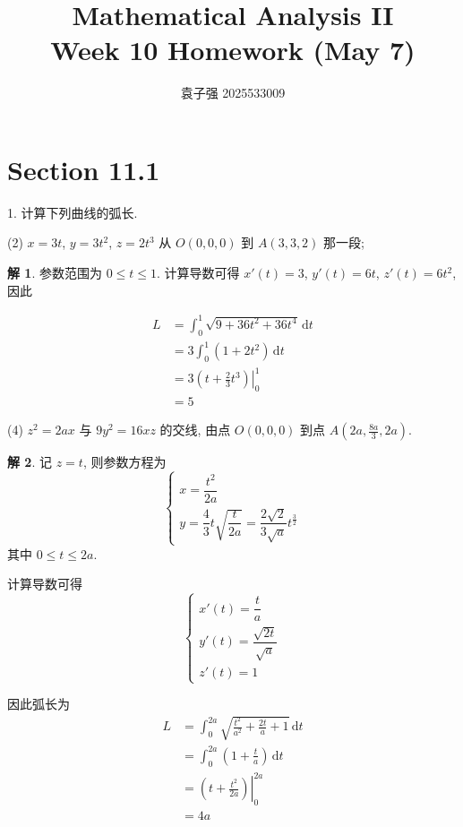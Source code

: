 \documentclass[a4paper,12pt]{article}
\title{Mathematical Analysis II\\Week 10 Homework (May 7)}
\author{袁子强\hspace{1cm} 2025533009}
\theoremstyle{definition}
\newtheorem*{sol}{解}
\begin{document}
\maketitle

\section*{Section 11.1}

1. 计算下列曲线的弧长.

(2) $x = 3t$, $y = 3t^2$, $z = 2t^3$ 从 $O(0,0,0)$ 到 $A(3,3,2)$ 那一段;
\begin{sol}
    参数范围为 $0 \leq t \leq 1$. 计算导数可得 $x'(t) = 3$, $y'(t) = 6t$, $z'(t) = 6t^2$, 因此

    \begin{align*}
        L & = \int_0^1 \sqrt{9 + 36t^2 + 36t^4} \, \mathrm{d}t       \\
          & = 3 \int_0^1 (1 + 2t^2) \, \mathrm{d}t                   \\
          & = 3 \left. \left( t + \frac{2}{3}t^3 \right) \right|_0^1 \\
          & = 5
    \end{align*}
\end{sol}
(4) $z^2 = 2ax$ 与 $9y^2 = 16xz$ 的交线, 由点 $O(0,0,0)$ 到点 $A\left(2a,\frac{8a}{3},2a\right)$.
\begin{sol}
    记 $z = t$, 则参数方程为
    $$
        \begin{cases}
            x = \dfrac{t^2}{2a} \\
            y = \dfrac{4}{3}t\sqrt{\dfrac{t}{2a}} = \dfrac{2\sqrt{2}}{3\sqrt{a}}t^{\frac{3}{2}}
        \end{cases}
    $$
    其中 $0 \leq t \leq 2a$.

    计算导数可得
    $$
        \begin{cases}
            x'(t) = \dfrac{t}{a}                \\
            y'(t) = \dfrac{\sqrt{2t}}{\sqrt{a}} \\
            z'(t) = 1
        \end{cases}
    $$

    因此弧长为
    \begin{align*}
        L & = \int_0^{2a} \sqrt{\frac{t^2}{a^2} + \frac{2t}{a} + 1} \, \mathrm{d}t \\
          & = \int_0^{2a} \left( 1 + \frac{t}{a} \right) \, \mathrm{d}t            \\
          & = \left. \left( t + \frac{t^2}{2a} \right) \right|_0^{2a}              \\
          & = 4a
    \end{align*}
\end{sol}
\end{document}
